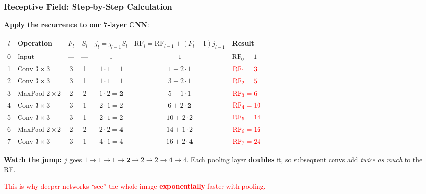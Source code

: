 \documentclass[notes,11pt, aspectratio=169]{beamer}
\begin{document}
\begin{frame}
\frametitle{Receptive Field: Step-by-Step Calculation}

\textbf{Apply the recurrence to our 7-layer CNN:}

\vspace{4pt}
\renewcommand{\arraystretch}{1.25}
\begin{center}
{\scriptsize
\begin{tabular}{clccccl}
\toprule
\textbf{$l$} & \textbf{Operation} & \textbf{$F_l$} & \textbf{$S_l$} & \textbf{$j_l = j_{l-1} S_l$} & \textbf{$\text{RF}_l = \text{RF}_{l-1} + (F_l-1) j_{l-1}$} & \textbf{Result} \\
\midrule
0 & Input & --- & --- & $1$ & $1$ & $\text{RF}_0 = 1$ \\
1 & Conv $3{\times}3$ & 3 & 1 & $1 \cdot 1 = 1$ & $1 + 2 \cdot 1$ & $\textcolor{red}{\text{RF}_1 = 3}$ \\
2 & Conv $3{\times}3$ & 3 & 1 & $1 \cdot 1 = 1$ & $3 + 2 \cdot 1$ & $\textcolor{red}{\text{RF}_2 = 5}$ \\
3 & MaxPool $2{\times}2$ & 2 & 2 & $1 \cdot 2 = \mathbf{2}$ & $5 + 1 \cdot 1$ & $\textcolor{red}{\text{RF}_3 = 6}$ \\
4 & Conv $3{\times}3$ & 3 & 1 & $2 \cdot 1 = 2$ & $6 + 2 \cdot \mathbf{2}$ & $\textcolor{red}{\text{RF}_4 = 10}$ \\
5 & Conv $3{\times}3$ & 3 & 1 & $2 \cdot 1 = 2$ & $10 + 2 \cdot 2$ & $\textcolor{red}{\text{RF}_5 = 14}$ \\
6 & MaxPool $2{\times}2$ & 2 & 2 & $2 \cdot 2 = \mathbf{4}$ & $14 + 1 \cdot 2$ & $\textcolor{red}{\text{RF}_6 = 16}$ \\
7 & Conv $3{\times}3$ & 3 & 1 & $4 \cdot 1 = 4$ & $16 + 2 \cdot \mathbf{4}$ & $\textcolor{red}{\text{RF}_7 = 24}$ \\
\bottomrule
\end{tabular}
}
\end{center}

\vspace{4pt}
\textbf{Watch the jump:} $j$ goes $1 \to 1 \to 1 \to \mathbf{2} \to 2 \to 2 \to \mathbf{4} \to 4$. Each pooling layer \textbf{doubles} it, so subsequent convs add \emph{twice as much} to the RF.

\vspace{2pt}
\textcolor{red}{This is why deeper networks ``see'' the whole image \textbf{exponentially} faster with pooling.}
\end{frame}
\end{document}
